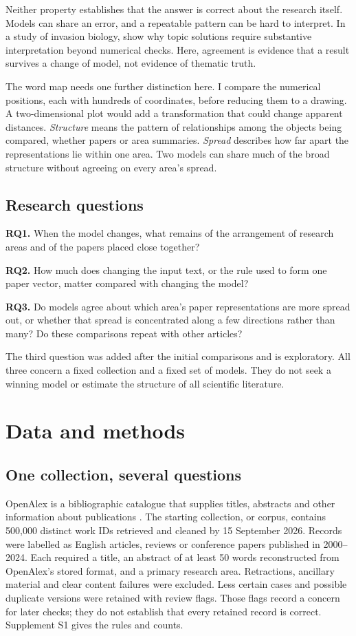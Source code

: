 \documentclass[12pt]{article}
\begin{document}
Neither property establishes that the answer is correct about the research itself. Models can share an error, and a repeatable pattern can be hard to interpret. In a study of invasion biology, \citet{QSSreviewQ17} show why topic solutions require substantive interpretation beyond numerical checks. Here, agreement is evidence that a result survives a change of model, not evidence of thematic truth.

The word map needs one further distinction here. I compare the numerical positions, each with hundreds of coordinates, before reducing them to a drawing. A two-dimensional plot would add a transformation that could change apparent distances. \emph{Structure} means the pattern of relationships among the objects being compared, whether papers or area summaries. \emph{Spread} describes how far apart the representations lie within one area. Two models can share much of the broad structure without agreeing on every area's spread.

\subsection{Research questions}
\textbf{RQ1.} When the model changes, what remains of the arrangement of research areas and of the papers placed close together?

\textbf{RQ2.} How much does changing the input text, or the rule used to form one paper vector, matter compared with changing the model?

\textbf{RQ3.} Do models agree about which area's paper representations are more spread out, or whether that spread is concentrated along a few directions rather than many? Do these comparisons repeat with other articles?

The third question was added after the initial comparisons and is exploratory. All three concern a fixed collection and a fixed set of models. They do not seek a winning model or estimate the structure of all scientific literature.

\section{Data and methods}
\subsection{One collection, several questions}
OpenAlex is a bibliographic catalogue that supplies titles, abstracts and other information about publications \citep{priem2022openalex}. The starting collection, or corpus, contains 500,000 distinct work IDs retrieved and cleaned by 15 September 2026. Records were labelled as English articles, reviews or conference papers published in 2000--2024. Each required a title, an abstract of at least 50 words reconstructed from OpenAlex's stored format, and a primary research area. Retractions, ancillary material and clear content failures were excluded. Less certain cases and possible duplicate versions were retained with review flags. Those flags record a concern for later checks; they do not establish that every retained record is correct. Supplement S1 gives the rules and counts.
\end{document}
